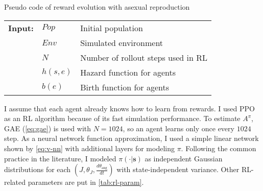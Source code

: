 \begin{algorithm}
  \caption{Pseudo code of reward evolution with asexual reproduction}\label{alg:reward-evo}
  \begin{tabular}{lll}
    \textbf{Input:} & $Pop$ & Initial population \\
                    & $Env$ & Simulated environment \\
                    & $N$ & Number of rollout steps used in RL \\
                    & $h(s, e)$ & Hazard function for agents \\
                    & $b(e)$ & Birth function for agents \\
  \end{tabular}
  \begin{algorithmic}[1]
    \Loop{}
      \EndOnce{}
    \EndFor{}

      \EndWith{}
      \EndWith{}
    \EndFor{}
  \EndLoop{}
\end{algorithmic}
\end{algorithm}

I assume that each agent already knows how to learn from rewards. I used PPO\citep{schulmanProximalPolicyOptimization2017} as an RL algorithm because of its fast simulation performance. To estimate $A^{\pi}$, GAE (\cref{eq:gae}) is used with $N=1024$, so an agent learns only once every $1024$ step. As a neural network function approximation, I used a simple linear network shown by \cref{eq:v-nn} with additional layers for modeling $\pi$. Following the common practice in the literature, I modeled $\pi(\cdot|\textbf{s})$ as independent Gaussian distributions for each $ (J, \theta_{J}, \frac{d\theta_{\textrm{ang}}}{dt}) $ with state-independent variance. Other RL-related parameters are put in \cref{tab:rl-param}.

